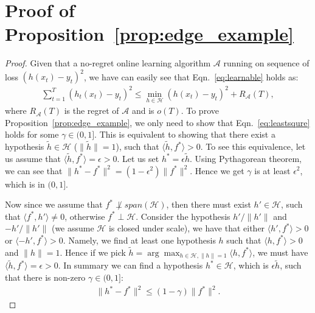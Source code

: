 %


\section{Proof of Proposition~\ref{prop:edge_example}}
\begin{proof}
Given that a no-regret online learning algorithm $\mathcal{A}$ running on sequence of loss $(h(x_t) - y_t)^2$, we have can easily see that Eqn.~\ref{eq:learnable} holds as:
\begin{align}
\sum_{t=1}^T(h_t(x_t) - y_t)^2\leq \min_{h\in\mathcal{H}}(h(x_t) - y_t)^2 + R_{\mathcal{A}}(T), 
\end{align}where $R_{\mathcal{A}}(T)$ is the regret of $\mathcal{A}$ and is $o(T)$. To prove Proposition~\ref{prop:edge_example}, we only need to show that Eqn.~\ref{eq:leastsqure} holds for some $\gamma\in(0,1]$. This is equivalent to showing that there exist a hypothesis $\tilde{h}\in\mathcal{H}$ ($\|\tilde{h}\| = 1$), such that $\langle \tilde{h}, f^* \rangle > 0$. To see this equivalence, let us assume that $\langle \tilde{h}, f^* \rangle = \epsilon > 0$. Let us set $h^* = \epsilon \tilde{h}$. Using Pythagorean theorem, we can see that $\| h^* - f^* \|^2 = (1-\epsilon^2)\|f^*\|^2$. Hence we get $\gamma$ is at least $\epsilon^2$, which is in $(0,1]$. 


Now since we assume that $f^*\not\perp span(\mathcal{H})$, then there must exist ${h}'\in \mathcal{H}$, such that $\langle f^*, h'\rangle\neq 0$, otherwise $f^*\perp\mathcal{H}$. Consider the hypothesis $h'/\|h'\|$ and $-h'/\|h'\|$ (we assume $\mathcal{H}$ is closed under scale), we have that either $\langle h', f^*\rangle >0$ or $\langle -h', f^* \rangle >0$. Namely, we find at least one hypothesis $h$ such that $\langle h, f^*\rangle >0$ and $\|h\| = 1$.  Hence if we pick $\tilde{h} = \arg\max_{h\in\mathcal{H}, \|h\|=1} \langle h, f^* \rangle$, we must have $\langle  \tilde{h}, f^*\rangle = \epsilon >0$. In summary we can find a hypothesis $h^*\in\mathcal{H}$, which is $\epsilon\tilde{h}$, such that there is non-zero $\gamma\in(0,1]$:
\begin{align}
\|h^* - f^* \|^2\leq (1-\gamma)\|f^*\|^2.
\end{align}







\end{proof}
